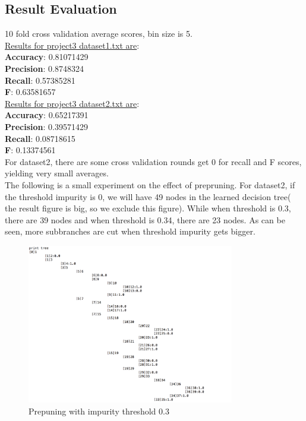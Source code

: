 \documentclass[paper=letter, fontsize=11pt]{article}
\numberwithin{equation}{section}		%
\numberwithin{figure}{section}			%
\numberwithin{table}{section}				%
\begin{document}
\subsection{Result Evaluation}
10 fold  cross validation average scores, bin size is 5.
\\
\noindent \underline{ Results for project3 dataset1.txt are}: \\ 
\textbf{Accuracy}: 0.81071429\\
\textbf{Precision}: 0.8748324\\
\textbf{Recall}: 0.57385281\\
\textbf{F}: 0.63581657\\

\noindent \underline{ Results for project3 dataset2.txt are}: \\ 
\textbf{Accuracy}: 0.65217391\\
\textbf{Precision}: 0.39571429\\
\textbf{Recall}: 0.08718615\\
\textbf{F}: 0.13374561\\

For dataset2, there are some cross validation rounds get 0 for recall and F scores,  yielding very small averages. 
\\

The following is a small experiment on the effect of prepruning. For dataset2, if the threshold impurity is 0, we will have 49 nodes in the learned decision tree( the result  figure is big, so we exclude this figure). While when threshold is 0.3, there are  39 nodes and when threshold is 0.34, there are 23 nodes. As can be seen, more subbranches are cut when threshold impurity gets bigger.
\begin{figure}[h]
  \centering
  \includegraphics[width=1\linewidth,height=7cm]{dataset2_threshold_3.png}
  \caption{Prepuning with impurity threshold 0.3}
\end{figure}
\end{document}

